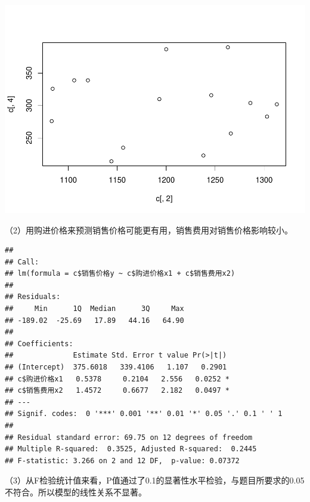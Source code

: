 \documentclass[]{article}
\newenvironment{Shaded}{\begin{snugshade}}{\end{snugshade}}
\newcommand{\KeywordTok}[1]{\textcolor[rgb]{0.13,0.29,0.53}{\textbf{#1}}}
\newcommand{\DataTypeTok}[1]{\textcolor[rgb]{0.13,0.29,0.53}{#1}}
\newcommand{\OperatorTok}[1]{\textcolor[rgb]{0.81,0.36,0.00}{\textbf{#1}}}
\newcommand{\NormalTok}[1]{#1}
\begin{document}
\includegraphics{Chapter14_files/figure-latex/unnamed-chunk-21-1.pdf}

（2）用购进价格来预测销售价格可能更有用，销售费用对销售价格影响较小。

\begin{Shaded}
\end{Shaded}

\begin{verbatim}
## 
## Call:
## lm(formula = c$销售价格y ~ c$购进价格x1 + c$销售费用x2)
## 
## Residuals:
##     Min      1Q  Median      3Q     Max 
## -189.02  -25.69   17.89   44.16   64.90 
## 
## Coefficients:
##              Estimate Std. Error t value Pr(>|t|)  
## (Intercept)  375.6018   339.4106   1.107   0.2901  
## c$购进价格x1   0.5378     0.2104   2.556   0.0252 *
## c$销售费用x2   1.4572     0.6677   2.182   0.0497 *
## ---
## Signif. codes:  0 '***' 0.001 '**' 0.01 '*' 0.05 '.' 0.1 ' ' 1
## 
## Residual standard error: 69.75 on 12 degrees of freedom
## Multiple R-squared:  0.3525, Adjusted R-squared:  0.2445 
## F-statistic: 3.266 on 2 and 12 DF,  p-value: 0.07372
\end{verbatim}

（3）从F检验统计值来看，P值通过了0.1的显著性水平检验，与题目所要求的0.05不符合。所以模型的线性关系不显著。
\end{document}
